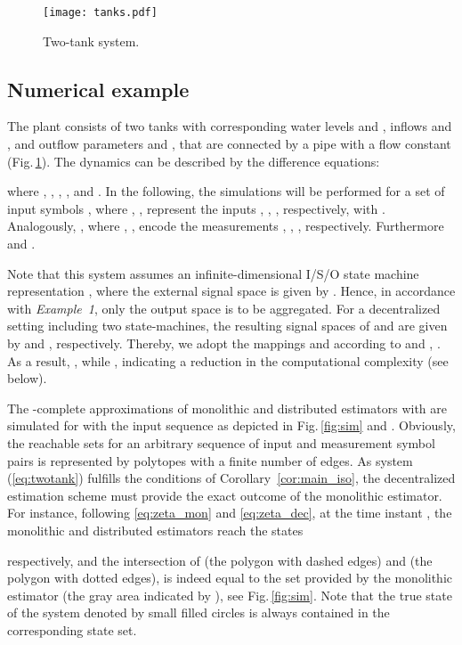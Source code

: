 \documentclass[a4paper, 10pt, conference]{ieeeconf}
\begin{document}
\begin{figure}[!h]
\vspace{-10pt}
   \centering
   \texttt{[image: tanks.pdf]}
\vspace{-10pt}
   \caption{Two-tank system.}
   \label{fig:tanks}
\vspace{-12pt}
\end{figure}


\subsection{Numerical example}
\label{sec:example}




The plant consists of two tanks with corresponding water levels  and , inflows  and , and outflow parameters  and , that are connected by a pipe with a flow constant  (Fig.\,\ref{fig:tanks}). The dynamics can be described by the difference equations:

where , , , , and . In the following, the simulations will be performed for a set of input symbols , where , ,  represent the inputs , , , respectively, with . Analogously, , where , ,  encode the measurements , , , respectively. Furthermore  and .


Note that this system assumes an infinite-dimensional I/S/O state machine representation , where the external signal space is given by . Hence, in accordance with \emph{Example~1}, only the output space is to be aggregated. For a decentralized setting including two state-machines, the resulting signal spaces of  and  are given by  and , respectively. Thereby, we adopt the mappings  and  according to  and , . As a result, , while , indicating a reduction in the computational complexity (see below).


The -complete approximations of monolithic and distributed estimators with  are simulated for  with the input sequence  as depicted in Fig.\,\ref{fig:sim} and . Obviously, the reachable sets for an arbitrary sequence of input and measurement symbol pairs is represented by polytopes with a finite number of edges. As  system (\ref{eq:twotank}) fulfills the conditions of Corollary~\ref{cor:main_iso}, the decentralized estimation scheme must provide the exact outcome of the monolithic estimator. For instance, following \eqref{eq:zeta_mon} and \eqref{eq:zeta_dec}, at the time instant  , the monolithic and distributed estimators reach the states

respectively, and the intersection of  (the polygon with dashed edges) and  (the polygon with dotted edges), is indeed equal to the set provided by the monolithic estimator (the gray area indicated by ), see Fig.\,\ref{fig:sim}.
Note that the true state of the system denoted by small filled circles is always contained in the corresponding state set.
\end{document}
